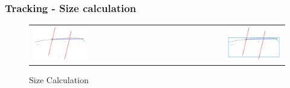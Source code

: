 \documentclass[nosymbols]{beamer}	%
\begin{document}
\begin{frame}
\frametitle{Tracking - Size calculation}
\begin{figure}[!ht]
\caption{Size Calculation}
\begin{tabular}{ l r }
 \includegraphics[width=0.45\textwidth,height=0.7\textheight,keepaspectratio]{bilder/obst_devide_angle_rot.png} &
 \includegraphics[width=0.45\textwidth,height=0.7\textheight,keepaspectratio]{bilder/obst_devide_angle_size.png}
\end{tabular}
\label{segments}
\end{figure}
\end{frame}
\end{document}
